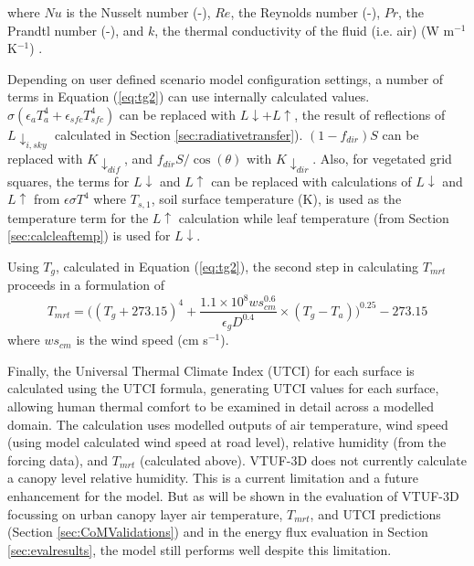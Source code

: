 \documentclass[final,3p,times,authoryear]{elsarticle}
\begin{document}
where $Nu$ is the Nusselt number (-),
$Re$, the Reynolds number (-),
$Pr$, the Prandtl number (-), and 
$k$, the thermal conductivity of the fluid (i.e. air) (W m$^{-1}$K$^{-1}$) \citep{Liljegren2008}.



Depending on user defined scenario model configuration settings, a number of terms in Equation (\ref{eq:tg2}) can use internally calculated values. $\sigma (\epsilon_{a} T_{a}^{4} + \epsilon_{sfc} T_{sfc}^{4} )$ can be replaced with $L\downarrow + L\uparrow$, the result of reflections of $L \downarrow_{i,sky}$ calculated in Section \ref{sec:radiativetransfer}). $(1-f_{dir})S$ can be replaced with $K \downarrow_{dif}$, and $f_{dir}S/ \cos(\theta)$ with $K \downarrow_{dir}$. Also, for vegetated grid squares, the terms for $L\downarrow$ and $L\uparrow$ can be replaced with calculations of $L\downarrow$ and $L\uparrow$ from $\epsilon \sigma T^{4}$ where $T_{s,1}$, soil surface temperature (K), is used as the temperature term for the $L\uparrow$ calculation while leaf temperature (from Section \ref{sec:calcleaftemp}) is used for $L\downarrow$. 

Using $T_{g}$, calculated in Equation (\ref{eq:tg2}), the second step in calculating $T_{mrt}$ proceeds in a formulation of \cite{Kantor2011} 
\begin{equation}\label{eq:tmrtbucket}
  T_{mrt} = 
  \bigg(
   (T_{g}+273.15)^{4} + 
    \frac{1.1 \times 10^{8}  ws_{cm}^{0.6}}{\epsilon_{g}  D^{0.4}}
    \times 
     (T_{g}-T_{a})
    \bigg)^{0.25} - 273.15
\end{equation}
 where $ws_{cm}$ is the wind speed (cm s$^{-1}$).




Finally, the Universal Thermal Climate Index (UTCI) for each surface is calculated using the \cite{Brode2009u} UTCI formula, generating UTCI values for each surface, allowing human thermal comfort to be examined in detail across a modelled domain. The calculation uses modelled outputs of air temperature, wind speed (using model calculated wind speed at road level), relative humidity (from the forcing data), and $T_{mrt}$ (calculated above). VTUF-3D does not currently calculate a canopy level relative humidity. This is a current limitation and a future enhancement for the model. But as will be shown in the evaluation of VTUF-3D focussing on urban canopy layer air temperature, $T_{mrt}$, and UTCI predictions (Section \ref{sec:CoMValidations}) and in the energy flux evaluation in Section \ref{sec:evalresults}, the model still performs well despite this limitation. 
\end{document}
